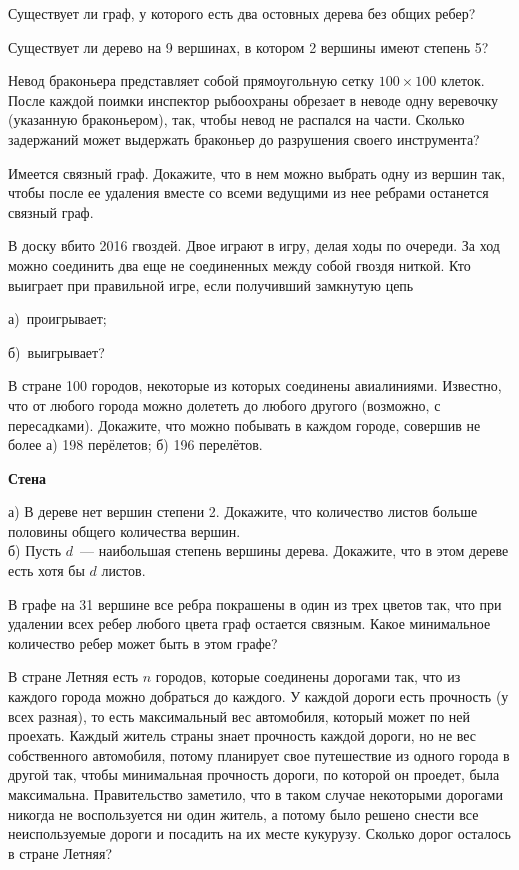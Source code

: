 \begin{problems}
\item Существует ли граф, у которого есть два остовных дерева без общих ребер?
\item Существует ли дерево на 9 вершинах, в котором 2 вершины имеют степень 5?
\item Невод браконьера представляет собой прямоугольную сетку $100\times 100$ клеток. После каждой поимки инспектор рыбоохраны обрезает в неводе одну веревочку (указанную браконьером), так, чтобы невод не распался на части. Сколько задержаний может выдержать браконьер до разрушения своего инструмента?
\item Имеется связный граф. Докажите, что в нем можно выбрать одну из вершин так, чтобы после ее
удаления вместе со всеми ведущими из нее ребрами останется связный граф.
\item В доску вбито 2016 гвоздей. Двое играют в игру, делая ходы по очереди. За ход можно соединить два еще не соединенных  между собой гвоздя ниткой. Кто выиграет при правильной игре, если получивший замкнутую цепь
    
    а)~проигрывает;
    
    б)~выигрывает?
\item В стране 100 городов, некоторые из которых соединены авиалиниями. Известно, что от любого города можно долететь до любого другого (возможно, с пересадками). Докажите, что можно побывать в каждом городе, совершив не более  а) 198 перёлетов;  б) 196 перелётов. 
\end{problems}
\begin{center}
\textbf{Стена}\\
\end{center}
\begin{problems}
\item а) В дереве нет вершин степени 2. Докажите, что количество листов
больше половины общего количества вершин.\\
б) Пусть $d$~--- наибольшая степень вершины дерева. Докажите, что в этом дереве есть хотя бы $d$ листов.
\item В графе на 31 вершине все ребра покрашены в один из трех цветов так, что при удалении всех ребер любого цвета граф остается связным. Какое минимальное количество ребер может быть в этом графе?
\item В стране Летняя есть $n$ городов, которые соединены дорогами так, что из каждого города можно добраться до каждого. У каждой дороги есть прочность (у всех разная), то есть максимальный вес автомобиля, который может по ней проехать. Каждый житель страны знает прочность каждой дороги, но не вес собственного автомобиля, потому планирует свое путешествие из одного города в другой так, чтобы минимальная прочность дороги, по которой он проедет, была максимальна. Правительство заметило, что в таком случае некоторыми дорогами никогда не воспользуется ни один житель, а потому было решено снести все неиспользуемые дороги и посадить на их месте кукурузу. Сколько дорог осталось в стране Летняя?
\end{problems}